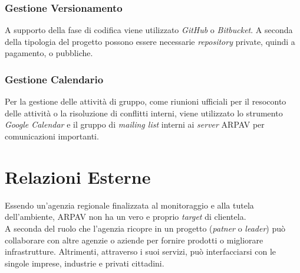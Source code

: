 \subsubsection{Gestione Versionamento}

A supporto della fase di codifica viene utilizzato \textit{GitHub} o \textit{Bitbucket}. A seconda della tipologia del progetto possono essere necessarie \textit{repository} private, quindi a pagamento, o pubbliche.

\subsubsection{Gestione Calendario}

Per la gestione delle attività di gruppo, come riunioni ufficiali per il resoconto delle attività o la risoluzione di conflitti interni, viene utilizzato lo strumento \textit{Google Calendar} e il gruppo di \textit{mailing list} interni ai \textit{server} ARPAV per comunicazioni importanti.







\section{Relazioni Esterne}


Essendo un'agenzia regionale finalizzata al monitoraggio e alla tutela dell'ambiente, ARPAV non ha un vero e proprio \textit{target} di clientela. \\
A seconda del ruolo che l'agenzia ricopre in un progetto (\textit{patner} o \textit{leader}) può collaborare con altre agenzie o aziende per fornire prodotti o migliorare infrastrutture. Altrimenti, attraverso i suoi servizi, può interfacciarsi con le singole imprese, industrie e  privati cittadini. 

